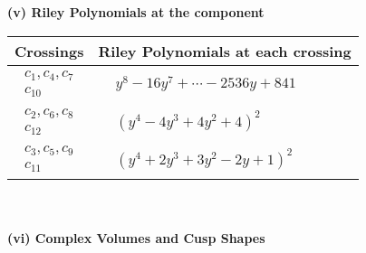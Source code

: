 \documentclass[1p]{elsarticle_modified}
\theoremstyle{definition}
\begin{document}
\newpage\renewcommand{\arraystretch}{1}
\flushleft \textbf{(v) Riley Polynomials at the component}\newline \\
\begin{tabular}{m{50pt}|m{274pt}}
Crossings & \hspace{64pt}Riley Polynomials at each crossing \\
\hline $$\begin{aligned}c_{1},c_{4},c_{7}\\c_{10}\end{aligned}$$&$\begin{aligned}
&y^8-16 y^7+\cdots-2536 y+841
\end{aligned}$\\
\hline $$\begin{aligned}c_{2},c_{6},c_{8}\\c_{12}\end{aligned}$$&$\begin{aligned}
&(y^4-4 y^3+4 y^2+4)^2
\end{aligned}$\\
\hline $$\begin{aligned}c_{3},c_{5},c_{9}\\c_{11}\end{aligned}$$&$\begin{aligned}
&(y^4+2 y^3+3 y^2-2 y+1)^2
\end{aligned}$\\
\hline
\end{tabular}\\~\\
\newpage\flushleft \textbf{(vi) Complex Volumes and Cusp Shapes}
\end{document}
